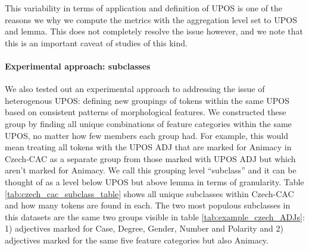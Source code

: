 \documentclass[USenglish]{article}
\begin{document}
This variability in terms of application and definition of UPOS is one of the reasons we why we compute the metrics with the aggregation level set to UPOS and lemma.
This does not completely resolve the issue however, and we note that this is an important caveat of studies of this kind.

\paragraph{Experimental approach: subclasses}
We also tested out an experimental approach to addressing the issue of heterogenous UPOS: defining new groupings of tokens within the same UPOS based on consistent patterns of morphological features.
We constructed these group by finding all unique combinations of feature categories within the same UPOS, no matter how few members each group had.
For example, this would mean treating all tokens with the UPOS ADJ that are marked for Animacy in Czech-CAC as a separate group from those marked with UPOS ADJ but which aren't marked for Animacy.
We call this grouping level ``subclass'' and it can be thought of as a level below UPOS but above lemma in terms of granularity. 
Table \ref{tab:czech_cac_subclass_table} shows all unique subclasses within Czech-CAC and how many tokens are found in each.
The two most populous subclasses in this datasets are the same two groups visible in table \ref{tab:example_czech_ADJs}: 1) adjectives marked for Case, Degree, Gender, Number and Polarity and 2) adjectives marked for the same five feature categories but also Animacy.
\end{document}
